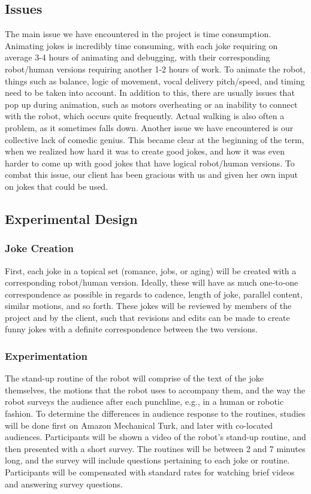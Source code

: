 \documentclass[onecolumn, draftclsnofoot,10pt, compsoc]{IEEEtran}
\begin{document}
\subsection{Issues}
The main issue we have encountered in the project is time consumption.
Animating jokes is incredibly time consuming, with each joke requiring on average 3-4 hours of animating and debugging, with their corresponding robot/human versions requiring another 1-2 hours of work. To animate the robot, things such as balance, logic of movement, vocal delivery pitch/speed, and timing need to be taken into account. In addition to this, there are usually issues that pop up during animation, such as motors overheating or an inability to connect with the robot, which occurs quite frequently. Actual walking is also often a problem, as it sometimes falls down.
Another issue we have encountered is our collective lack of comedic genius. This became clear at the beginning of the term, when we realized how hard it was to create good jokes, and how it was even harder to come up with good jokes that have logical robot/human versions. To combat this issue, our client has been gracious with us and given her own input on jokes that could be used.
\subsection{Experimental Design}

\subsubsection{Joke Creation}
First, each joke in a topical set (romance, jobs, or aging) will be created with a corresponding robot/human version.
Ideally, these will have as much one-to-one correspondence as possible in regards to cadence, length of joke, parallel content, similar motions, and so forth.
These jokes will be reviewed by members of the project and by the client, such that revisions and edits can be made to create funny jokes with a definite correspondence between the two versions.

\subsubsection{Experimentation}
The stand-up routine of the robot will comprise of the text of the joke themselves, the motions that the robot uses to accompany them, and the way the robot surveys the audience after each punchline, e.g., in a human or robotic fashion.
To determine the differences in audience response to the routines, studies will be done first on Amazon Mechanical Turk, and later with co-located audiences.
Participants will be shown a video of the robot's stand-up routine, and then presented with a short survey.
The routines will be between 2 and 7 minutes long, and the survey will include questions pertaining to each joke or routine.
Participants will be compensated with standard rates for watching brief videos and answering survey questions.
\end{document}
